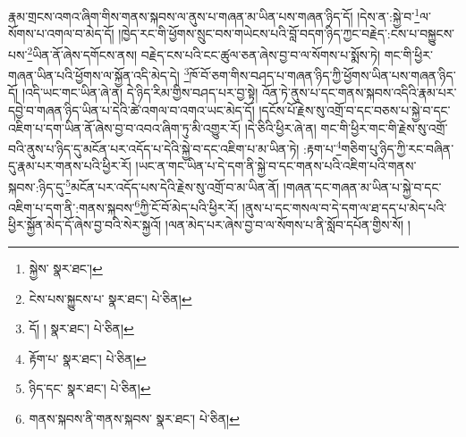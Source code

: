 རྣམ་གྲངས་འགའ་ཞིག་གིས་གནས་སྐབས་ལ་ནུས་པ་གཞན་མ་ཡིན་པས་གཞན་ཉིད་དོ། །དེས་ན་:སྐྱེ་བ་\footnote{སྐྱེས་  སྣར་ཐང་། }ལ་སོགས་པ་འགལ་བ་མེད་དོ། །ཁྱེད་རང་གི་ཕྱོགས་སྲུང་བས་གཡེངས་པའི་བློ་བདག་ཉིད་ཀྱང་བརྗེད་:ངས་པ་བསྐྱུངས་པས་\footnote{ངེས་པས་སྐྱུངས་པ་  སྣར་ཐང་།  པེ་ཅིན། }ཡིན་ནོ་ཞེས་དགོངས་ནས། བརྗེད་ངས་པའི་ངང་ཚུལ་ཅན་ཞེས་བྱ་བ་ལ་སོགས་པ་སྨོས་ཏེ། གང་གི་ཕྱིར་གཞན་ཡིན་པའི་ཕྱོགས་ལ་སྐྱོན་འདི་མེད་དེ། \footnote{དོ། །   སྣར་ཐང་།  པེ་ཅིན། }ཁོ་བོ་ཅག་གིས་བཤད་པ་གཞན་ཉིད་ཀྱི་ཕྱོགས་ཡིན་པས་གཞན་ཉིད་དོ། །འདི་ཡང་གང་ཡིན་ཞེ་ན། དེ་ཉིད་རིམ་གྱིས་བཤད་པར་བྱ་སྟེ། འོན་ཏེ་ནུས་པ་དང་གནས་སྐབས་འདིའི་རྣམ་པར་དབྱེ་བ་གཞན་ཉིད་ཡིན་པ་དེའི་ཚེ་འགལ་བ་འགའ་ཡང་མེད་དོ། །དངོས་པོ་རྗེས་སུ་འགྲོ་བ་དང་བཅས་པ་སྐྱེ་བ་དང་འཇིག་པ་དག་ཡིན་ནོ་ཞེས་བྱ་བ་འབའ་ཞིག་ཏུ་མི་འགྱུར་རོ། །དེ་ཅིའི་ཕྱིར་ཞེ་ན། གང་གི་ཕྱིར་གང་གི་རྗེས་སུ་འགྲོ་བའི་ནུས་པ་ཉིད་དུ་མངོན་པར་འདོད་པ་དེའི་སྐྱེ་བ་དང་འཇིག་པ་མ་ཡིན་ཏེ། :རྟག་པ་\footnote{རྟོག་པ་  སྣར་ཐང་།  པེ་ཅིན། }གཅིག་པུ་ཉིད་ཀྱི་རང་བཞིན་དུ་རྣམ་པར་གནས་པའི་ཕྱིར་རོ། །ཡང་ན་གང་ཡིན་པ་དེ་དག་ནི་སྐྱེ་བ་དང་གནས་པའི་འཇིག་པའི་གནས་སྐབས་:ཉིད་དུ་\footnote{ཉིད་དང་  སྣར་ཐང་།  པེ་ཅིན། }མངོན་པར་འདོད་པས་དེའི་རྗེས་སུ་འགྲོ་བ་མ་ཡིན་ནོ། །གཞན་དང་གཞན་མ་ཡིན་པ་སྐྱེ་བ་དང་འཇིག་པ་དག་ནི་:གནས་སྐབས་\footnote{གནས་སྐབས་ནི་གནས་སྐབས་  སྣར་ཐང་།  པེ་ཅིན། }ཀྱི་ངོ་བོ་མེད་པའི་ཕྱིར་རོ། །ནུས་པ་དང་གསལ་བ་དེ་དག་ལ་ཐ་དད་པ་མེད་པའི་ཕྱིར་སྐྱོན་མེད་དོ་ཞེས་བྱ་བའི་སེར་སྐྱའོ། །ལན་མེད་པར་ཞེས་བྱ་བ་ལ་སོགས་པ་ནི་སློབ་དཔོན་གྱིས་སོ། །
